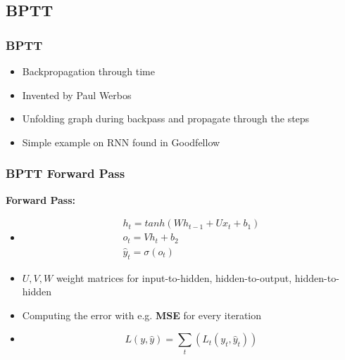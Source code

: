  \subsection{BPTT}
  \begin{frame}
   \frametitle{BPTT}
   
   \begin{itemize}
    \item<1-> Backpropagation through time
    \item<2-> Invented by Paul Werbos \cite{Werbos1990}
    \item<3-> Unfolding graph during backpass and propagate through the steps
    \item<4-> Simple example on RNN found in Goodfellow \cite{Goodfellow2016}
   \end{itemize}
   
  \end{frame}
  \begin{frame}
   \frametitle{BPTT Forward Pass}
   
    \textbf{Forward Pass:}
   
   \begin{itemize}
    \item<2->{
    \begin{align}
     h_t = tanh(Wh_{t-1} + Ux_t+b_1) \\
     o_t = Vh_t + b_2 \\
     \hat{y}_t = \sigma(o_t)
    \end{align}        
    }
    \item<3-> $U,V,W$ weight matrices for input-to-hidden, hidden-to-output, hidden-to-hidden
    \item<4-> Computing the error with e.g. \textbf{MSE} for every iteration
    \item<5->{
    \begin{equation}
     L(y,\hat{y}) = \sum_t(L_t(y_t,\hat{y}_t))
    \end{equation}        
    }
   \end{itemize}     
  
  \end{frame}
